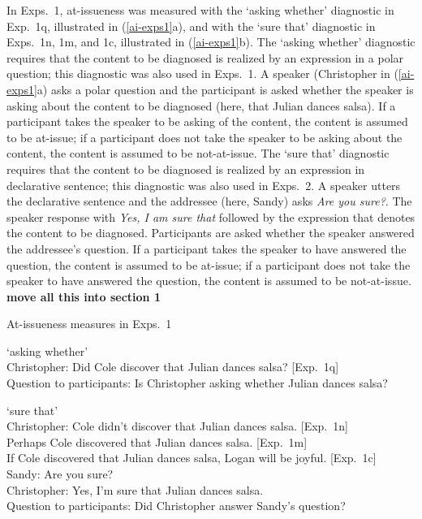 \documentclass[11pt,fleqn]{article}
\newcommand{\6}{\mbox{$[\hspace*{-.6mm}[$}}
\newcommand{\9}{\mbox{$]\hspace*{-.6mm}]$}}
\begin{document}
In Exps.~1, at-issueness was measured with the `asking whether' diagnostic in Exp.~1q, illustrated in (\ref{ai-exps1}a), and with the `sure that' diagnostic in Exps.~1n, 1m, and 1c, illustrated in (\ref{ai-exps1}b). The `asking whether' diagnostic requires that the content to be diagnosed is realized by an expression in a polar question; this diagnostic was also used in \citealt{tbd-variability} Exps.~1. A speaker (Christopher in (\ref{ai-exps1}a) asks a polar question and the participant is asked whether the speaker is asking about the content to be diagnosed (here, that Julian dances salsa). If a participant takes the speaker to be asking of the content, the content is assumed to be at-issue; if a participant does not take the speaker to be asking about the content, the content is assumed to be not-at-issue. The `sure that' diagnostic requires that the content to be diagnosed is realized by an expression in declarative sentence; this diagnostic was also used in \citealt{tbd-variability} Exps.~2. A speaker utters the declarative sentence and the addressee (here, Sandy) asks {\em Are you sure?}. The speaker response with {\em Yes, I am sure that} followed by the expression that denotes the content to be diagnosed. Participants are asked whether the speaker answered the addressee's question. If a participant takes the speaker to have answered the question, the content is assumed to be at-issue; if a participant does not take the speaker to have answered the question, the content is assumed to be not-at-issue. {\bf move all this into section 1}

\begin{exe}
\ex\label{ai-exps1} At-issueness measures in Exps.~1
\begin{xlist}
\ex `asking whether' \\ Christopher: Did Cole discover that Julian dances salsa? \hfill [Exp.~1q]
\\ Question to participants: Is Christopher asking whether Julian dances salsa?

\ex `sure that' \\ Christopher: Cole didn't discover that Julian dances salsa.  \hfill [Exp.~1n]
\\ \hspace*{2cm} Perhaps Cole discovered that Julian dances salsa.  \hfill [Exp.~1m]
\\ \hspace*{2cm} If Cole discovered that Julian dances salsa, Logan will be joyful.  \hfill [Exp.~1c]
\\ Sandy: Are you sure?
\\ Christopher: Yes, I'm sure that Julian dances salsa.
\\ Question to participants: Did Christopher answer Sandy's question?

\end{xlist}
\end{exe}
\end{document}
